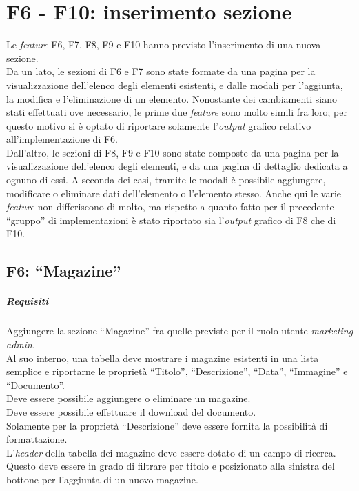 \newpage\section{F6 - F10: inserimento sezione}
Le \textit{feature} F6, F7, F8, F9 e F10 hanno previsto l'inserimento di una nuova sezione.\\
Da un lato, le sezioni di F6 e F7 sono state formate da una pagina per la visualizzazione dell'elenco degli elementi esistenti, e dalle modali per l'aggiunta, la modifica e l'eliminazione di un elemento. Nonostante dei cambiamenti siano stati effettuati ove necessario, le prime due \textit{feature} sono molto simili fra loro; per questo motivo si è optato di riportare solamente l'\textit{output} grafico relativo all'implementazione di F6.\\
Dall'altro, le sezioni di F8, F9 e F10 sono state composte da una pagina per la visualizzazione dell'elenco degli elementi, e da una pagina di dettaglio dedicata a ognuno di essi. A seconda dei casi, tramite le modali è possibile aggiungere, modificare o eliminare dati dell'elemento o l'elemento stesso. Anche qui le varie \textit{feature} non differiscono di molto, ma rispetto a quanto fatto per il precedente “gruppo” di implementazioni è stato riportato sia l'\textit{output} grafico di F8 che di F10.

\subsection{F6: “Magazine”}
\label{subsec:F6: “Magazine”}
\subparagraph{Requisiti}
Aggiungere la sezione “Magazine” fra quelle previste per il ruolo utente \textit{marketing admin}.\\
Al suo interno, una tabella deve mostrare i magazine esistenti in una lista semplice e riportarne le proprietà “Titolo”, “Descrizione”, “Data”, “Immagine” e “Documento”.\\
Deve essere possibile aggiungere o eliminare un magazine.\\
Deve essere possibile effettuare il download del documento.\\
Solamente per la proprietà “Descrizione” deve essere fornita la possibilità di formattazione.\\
L'\textit{header} della tabella dei magazine deve essere dotato di un campo di ricerca. Questo deve essere in grado di filtrare per titolo e posizionato alla sinistra del bottone per l'aggiunta di un nuovo magazine.

